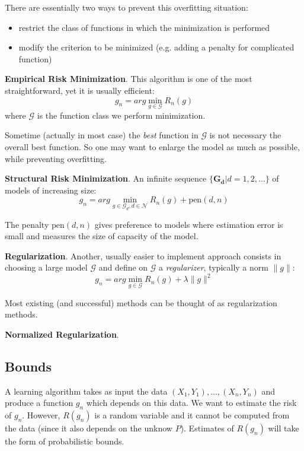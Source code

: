 \documentclass[12pt,reqno]{amsart}
\begin{document}
There are essentially two ways to prevent this overfitting situation:
\begin{itemize}
\item restrict the class of functions in which the minimization is performed 
\item modify the criterion to be minimized (e.g. adding a penalty for complicated function)
\end{itemize}

\textbf{Empirical Risk Minimization}. This algorithm is one of the most straightforward, yet it is usually efficient:
\begin{equation}
	g_n = arg \min_{g\in \mathcal{G}} R_n(g)
\end{equation}
where $\mathcal{G}$ is the function class we perform minimization.

Sometime (actually in most case) the \textit{best} function in $\mathcal{G}$ is not necessary the overall best function. So one may want to enlarge the model as much as possible, while preventing overfitting.

\textbf{Structural Risk Minimization}.
An infinite sequence $\{\mathbf{G_d} | d=1, 2, \ldots \}$ of models of increasing size:
\begin{equation}
	g_n = arg \min_{g\in \mathcal{G}_d, d\in\mathcal{N}} R_n(g) + \text{pen}(d,n)
\end{equation}

The penalty $\text{pen}(d,n)$ gives preference to models where estimation error is small and measures the size of capacity of the model.



\textbf{Regularization}. Another, usually easier to implement approach consists in choosing a large model $\mathcal{G}$ and define on $\mathcal{G}$ a \textit{regularizer}, typically a norm $\|g\|$:
\begin{equation}
	g_n = arg \min_{g\in \mathcal{G}} R_n(g) + \lambda \|g\|^2
\end{equation}

Most existing (and successful) methods can be thought of
as regularization methods.


\textbf{Normalized Regularization}.

\subsection{Bounds} A learning algorithm takes as input the data $(X_1, Y_1), \ldots, (X_n, Y_n)$ and produce a function $g_n$ which depends on this data. We want to estimate the risk of $g_n$. However, $R(g_n)$ is a random variable and it cannot be computed from the data (since it also depends on the unknow $P$). Estimates of $R(g_n)$ will take the form of probabilistic bounds.
\end{document}
